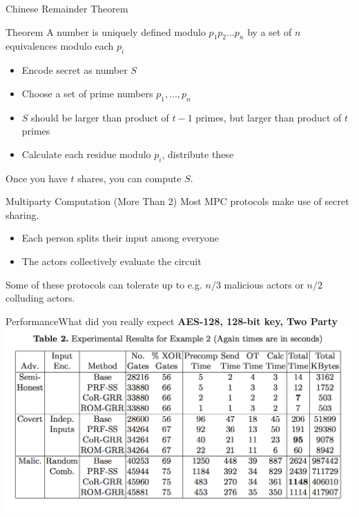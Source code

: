 \documentclass[12pt]{beamer}
\begin{document}
\begin{frame}{Chinese Remainder Theorem}
	\begin{block}{Theorem}
		A number is uniquely defined modulo $p_1p_2...p_n$ by a set of $n$
		equivalences modulo each $p_i$
	\end{block}

	\begin{itemize}
		\item Encode secret as number $S$
		\item Choose a set of prime numbers $p_1, ..., p_n$
		\item $S$ should be larger than product of $t-1$ primes, but larger than
			product of $t$ primes
		\item Calculate each residue modulo $p_i$, distribute these
	\end{itemize}

	Once you have $t$ shares, you can compute $S$.
\end{frame}

\begin{frame}{Multiparty Computation (More Than 2)}
	Most MPC protocols make use of secret sharing.

	\begin{itemize}
		\item Each person splits their input among everyone
		\item The actors collectively evaluate the circuit
	\end{itemize}

	\begin{block}{}
		Some of these protocols can tolerate up to e.g. $n/3$ malicious actors
		or $n/2$ colluding actors.
	\end{block}
\end{frame}

\begin{frame}{Performance}{What did you really expect}
	\textbf{AES-128, 128-bit key, Two Party}
	\includegraphics[width=\textwidth]{./pictures/smp-aes-performance1}
\end{frame}
\end{document}
